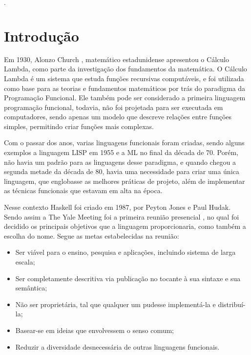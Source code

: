 \documentclass[
  article,			       %
  12pt,				         %
  oneside,			       %
  a4paper,			       %
  english,		       	 %
  brazil,			      	 %
  sumario=tradicional
]{abntex2}
\begin{document}
 

    \renewcommand{\thesection}{\noindent\arabic{chapter}.\arabic{section}}. 
    \frenchspacing
    \imprimircapa
    \tableofcontents*
    \cleardoublepage
    \textual
    \newpage
    \chapter{Introdução}

    Em 1930, Alonzo Church , matemático estadunidense apresentou o Cálculo Lambda, como parte da investigação dos fundamentos da matemática. O Cálculo Lambda é um sistema que
    estuda funções recursivas computáveis, e foi utilizada como base para as teorias e fundamentos matemáticos por trás do paradigma da Programação Funcional. Ele também
    pode ser considerado a primeira linguagem programação funcional, todavia, não foi projetada para ser executada em computadores, sendo apenas um modelo que descreve relações entre funções
    simples, permitindo criar funções mais complexas.

    Com o passar dos anos, varias linguagens funcionais foram criadas, sendo alguns exemplos a linguagem LISP em 1955 e a ML no final da década de 70. Porém, não
    havia um padrão para as linguagens desse paradigma, e quando chegou a segunda metade da década de 80, havia uma necessidade para criar uma única linguagem, que englobasse
    as melhores práticas de projeto, além de implementar as técnicas funcionais que estavam em alta na época.

    Nesse contexto Haskell foi criado em 1987, por Peyton Jones e Paul Hudak. Sendo assim a The Yale Meeting foi a primeira reunião presencial , no qual foi decidido
    os principais objetivos que a linguagem proporcionaria, como também a escolha do nome. 
    Segue as metas estabelecidas na reunião:

    \begin{itemize}
      \item Ser viável para o ensino, pesquisa e aplicações, incluindo sistema de larga escala;
      \item Ser completamente descritiva via publicação no tocante à sua sintaxe e sua semântica;
      \item Não ser proprietária, tal que qualquer um pudesse implementá-la e distribuí-la;
      \item Basear-se em ideias que envolvessem o senso comum;
      \item Reduzir a diversidade desnecessária de outras linguagens funcionais.
    \end{itemize} 
\end{document}
